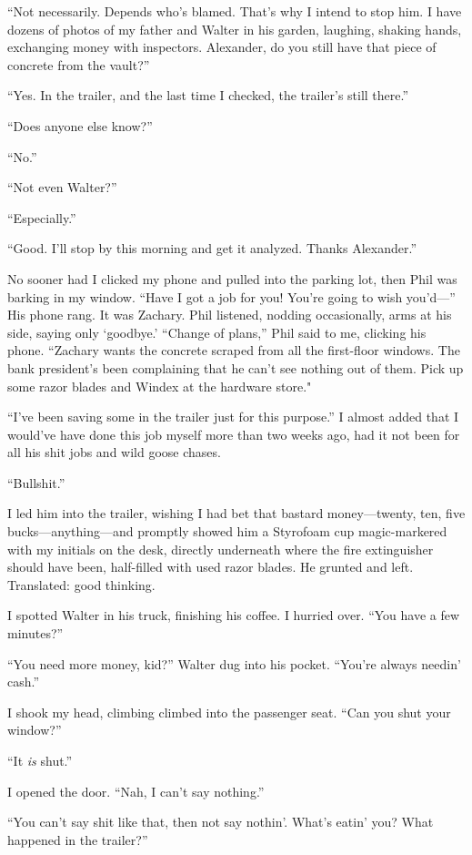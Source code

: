 ``Not necessarily. Depends who's blamed. That's why I intend to stop
him. I have dozens of photos of my father and Walter in his garden,
laughing, shaking hands, exchanging money with inspectors. Alexander, do
you still have that piece of concrete from the vault?''

``Yes. In the trailer, and the last time I checked, the trailer's still
there.''

``Does anyone else know?''

``No.''

``Not even Walter?''

``Especially.''

``Good. I'll stop by this morning and get it analyzed. Thanks
Alexander.''

No sooner had I clicked my phone and pulled into the parking lot, then
Phil was barking in my window. ``Have I got a job for you! You're going
to wish you'd---'' His phone rang. It was Zachary. Phil listened,
nodding occasionally, arms at his side, saying only `goodbye.' ``Change
of plans,'' Phil said to me, clicking his phone. ``Zachary wants the
concrete scraped from all the first-floor windows. The bank president's
been complaining that he can't see nothing out of them. Pick up some
razor blades and Windex at the hardware store."

``I've been saving some in the trailer just for this purpose.'' I almost
added that I would've have done this job myself more than two weeks ago,
had it not been for all his shit jobs and wild goose chases.

``Bullshit.''

I led him into the trailer, wishing I had bet that bastard
money---twenty, ten, five bucks---anything---and promptly showed him a
Styrofoam cup magic-markered with my initials on the desk, directly
underneath where the fire extinguisher should have been, half-filled
with used razor blades. He grunted and left. Translated: good thinking.

I spotted Walter in his truck, finishing his coffee. I hurried over.
``You have a few minutes?''

``You need more money, kid?'' Walter dug into his pocket. ``You're
always needin' cash.''

I shook my head, climbing climbed into the passenger seat. ``Can you
shut your window?''

``It \emph{is} shut.''

I opened the door. ``Nah, I can't say nothing.''

``You can't say shit like that, then not say nothin'. What's eatin' you?
What happened in the trailer?''

